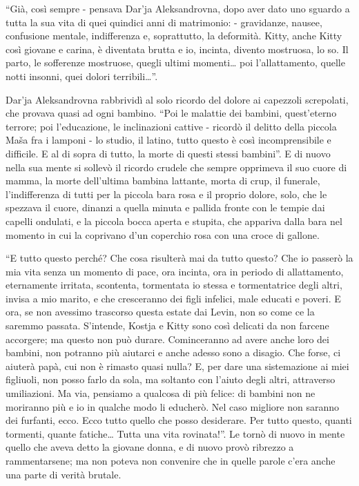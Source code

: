 ``Già, così sempre - pensava Dar'ja Aleksandrovna, dopo aver dato uno sguardo a tutta la sua vita di quei quindici anni di matrimonio: - gravidanze, nausee, confusione mentale, indifferenza e, soprattutto, la deformità. Kitty, anche Kitty così giovane e carina, è diventata brutta e io, incinta, divento mostruosa, lo so. Il parto, le sofferenze mostruose, quegli ultimi momenti\ldots{} poi l'allattamento, quelle notti insonni, quei dolori terribili\ldots{}''. 

Dar'ja Aleksandrovna rabbrividì al solo ricordo del dolore ai capezzoli screpolati, che provava quasi ad ogni bambino. ``Poi le malattie dei bambini, quest'eterno terrore; poi l'educazione, le inclinazioni cattive - ricordò il delitto della piccola Maša fra i lamponi - lo studio, il latino, tutto questo è così incomprensibile e difficile. E al di sopra di tutto, la morte di questi stessi bambini''. E di nuovo nella sua mente si sollevò il ricordo crudele che sempre opprimeva il suo cuore di mamma, la morte dell'ultima bambina lattante, morta di crup, il funerale, l'indifferenza di tutti per la piccola bara rosa e il proprio dolore, solo, che le spezzava il cuore, dinanzi a quella minuta e pallida fronte con le tempie dai capelli ondulati, e la piccola bocca aperta e stupita, che appariva dalla bara nel momento in cui la coprivano d'un coperchio rosa con una croce di gallone. 
\enlargethispage*{1\baselineskip}

``E tutto questo perché? Che cosa risulterà mai da tutto questo? Che io passerò la mia vita senza un momento di pace, ora incinta, ora in periodo di allattamento, eternamente irritata, scontenta, tormentata io stessa e tormentatrice degli altri, invisa a mio marito, e che cresceranno dei figli infelici, male educati e poveri. E ora, se non avessimo trascorso questa estate dai Levin, non so come ce la saremmo passata. S'intende, Kostja e Kitty sono così delicati da non farcene accorgere; ma questo non può durare. Cominceranno ad avere anche loro dei bambini, non potranno più aiutarci e anche adesso sono a disagio. Che forse, ci aiuterà papà, cui non è rimasto quasi nulla? E, per dare una sistemazione ai miei figliuoli, non posso farlo da sola, ma soltanto con l'aiuto degli altri, attraverso umiliazioni. Ma via, pensiamo a qualcosa di più felice: di bambini non ne moriranno più e io in qualche modo li educherò. Nel caso migliore non saranno dei furfanti, ecco. Ecco tutto quello che posso desiderare. Per tutto questo, quanti tormenti, quante fatiche\ldots{} Tutta una vita rovinata!''. Le tornò di nuovo in mente quello che aveva detto la giovane donna, e di nuovo provò ribrezzo a rammentarsene; ma non poteva non convenire che in quelle parole c'era anche una parte di verità brutale. 
\enlargethispage{\baselineskip}

